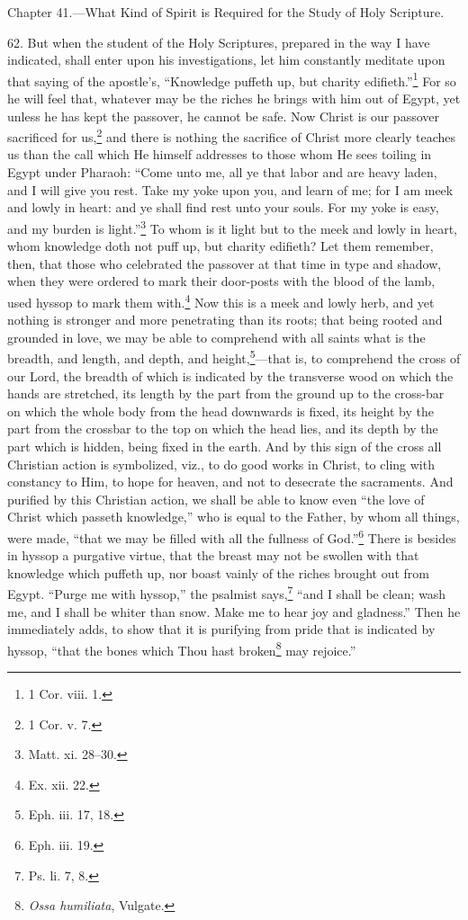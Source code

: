 
Chapter 41.—What Kind of Spirit is Required for the Study of Holy Scripture.

62. But when the student of the Holy Scriptures, prepared in the way I have indicated, shall enter upon his investigations, let him constantly meditate upon that saying of the apostle’s, “Knowledge puffeth up, but charity edifieth.”\footnote{1 Cor. viii. 1.} For so he will feel that, whatever may be the riches he brings with him out of Egypt, yet unless he has kept the passover, he cannot be safe. Now Christ is our passover sacrificed for us,\footnote{1 Cor. v. 7.} and there is nothing the sacrifice of Christ more clearly teaches us than the call which He himself addresses to those whom He sees toiling in Egypt under Pharaoh: “Come unto me, all ye that labor and are heavy laden, and I will give you rest. Take my yoke upon you, and learn of me; for I am meek and lowly in heart: and ye shall find rest unto your souls. For my yoke is easy, and my burden is light.”\footnote{Matt. xi. 28–30.} To whom is it light but to the meek and lowly in heart, whom knowledge doth not puff up, but charity edifieth? Let them remember, then, that those who celebrated the passover at that time in type and shadow, when they were ordered to mark their door-posts with the blood of the lamb, used hyssop to mark them with.\footnote{Ex. xii. 22.} Now this is a meek and lowly herb, and yet nothing is stronger and more penetrating than its roots; that being rooted and grounded in love, we may be able to comprehend with all saints what is the breadth, and length, and depth, and height,\footnote{Eph. iii. 17, 18.}—that is, to comprehend the cross of our Lord, the breadth of which is indicated by the transverse wood on which the hands are stretched, its length by the part from the ground up to the cross-bar on which the whole body from the head downwards is fixed, its height by the part from the crossbar to the top on which the head lies, and its depth by the part which is hidden, being fixed in the earth. And by this sign of the cross all Christian action is symbolized, viz., to do good works in Christ, to cling with constancy to Him, to hope for heaven, and not to desecrate the sacraments. And purified by this Christian action, we shall be able to know even “the love of Christ which passeth knowledge,” who is equal to the Father, by whom all things, were made, “that we may be filled with all the fullness of God.”\footnote{Eph. iii. 19.} There is besides in hyssop a purgative virtue, that the breast may not be swollen with that knowledge which puffeth up, nor boast vainly of the riches brought out from Egypt. “Purge me with hyssop,” the psalmist says,\footnote{Ps. li. 7, 8.} “and I shall be clean; wash me, and I shall be whiter than snow. Make me to hear joy and gladness.” Then he immediately adds, to show that it is purifying from pride that is indicated by hyssop, “that the bones which Thou hast broken\footnote{\emph{Ossa humiliata}, Vulgate.} may rejoice.”

